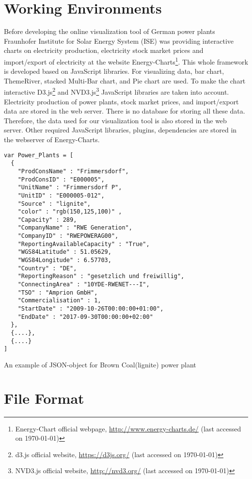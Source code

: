 \section{Working Environments}

Before developing the online visualization tool of German power plants Fraunhofer Institute for Solar Energy System (ISE) was providing interactive charts on electricity production, electricity stock market prices and import/export of electricity at the website Energy-Charts\footnote{Energy-Chart official webpage, \url{http://www.energy-charts.de/} (last accessed on {\today})}. This whole framework is developed based on JavaScript libraries. For visualizing data, bar chart, ThemeRiver, stacked Multi-Bar chart, and Pie chart are used. To make the chart interactive D3.js\footnote{d3.js official website, \url{https://d3js.org/} (last accessed on {\today})} and NVD3.js\footnote{NVD3.js official website, \url{http://nvd3.org/} (last accessed on {\today})} JavaScript libraries are taken into account. Electricity production of power plants, stock market prices, and import/export data are stored in the web server. There is no database for storing all these data. Therefore, the data used for our visualization tool is also stored in the web server. Other required JavaScript libraries, plugins, dependencies are stored in the webserver of Energy-Charts.

\begin{Listing}
\begin{lstlisting}
var Power_Plants = [
  { 
    "ProdConsName" : "Frimmersdorf",
    "ProdConsID" : "E000005",
    "UnitName" : "Frimmersdorf P",
    "UnitID" : "E000005-012",
    "Source" : "lignite",
    "color" : "rgb(150,125,100)" ,
    "Capacity" : 289,
    "CompanyName" : "RWE Generation",
    "CompanyID" : "RWEPOWERAG00",
    "ReportingAvailableCapacity" : "True",
    "WGS84Latitude" : 51.05629,
    "WGS84Longitude" : 6.57703,
    "Country" : "DE",
    "ReportingReason" : "gesetzlich und freiwillig",
    "ConnectingArea" : "10YDE-RWENET---I",
    "TSO" : "Amprion GmbH",
    "Commercialisation" : 1,
    "StartDate" : "2009-10-26T00:00:00+01:00",
    "EndDate" : "2017-09-30T00:00:00+02:00"
  },
  {....},
  {....}
]
\end{lstlisting}
\caption{An example of JSON-object for Brown Coal(lignite) power plant}
\label{lst:pp-json}
\end{Listing}

\section{File Format}

